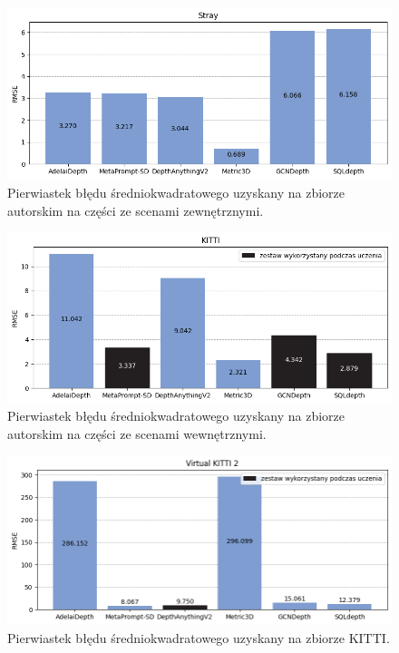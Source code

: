 \begin{figure}[H]
    \centering
    \includegraphics{plots/rmse/3}
    \caption{Pierwiastek błędu średniokwadratowego uzyskany na zbiorze autorskim na części ze scenami zewnętrznymi.}
    \label{fig:rmse_3}
\end{figure}
\begin{figure}[H]
    \centering
    \includegraphics{plots/rmse/4}
    \caption{Pierwiastek błędu średniokwadratowego uzyskany na zbiorze autorskim na części ze scenami wewnętrznymi.}
    \label{fig:rmse_4}
\end{figure}
\begin{figure}[H]
    \centering
    \includegraphics{plots/rmse/5}
    \caption{Pierwiastek błędu średniokwadratowego uzyskany na zbiorze KITTI.}
    \label{fig:rmse_5}
\end{figure}
